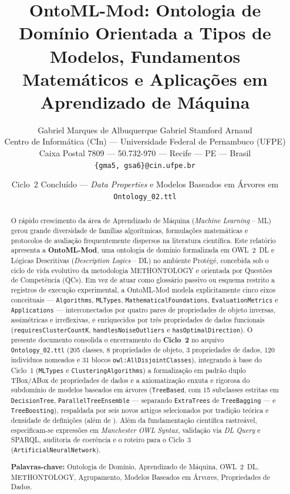 \documentclass[11pt,a4paper]{article}
\title{\textbf{\Large OntoML-Mod: Ontologia de Domínio Orientada a Tipos de Modelos, Fundamentos Matemáticos e Aplicações em Aprendizado de Máquina}}
\author{
  Gabriel Marques de Albuquerque \quad Gabriel Stamford Arnaud \\
  \small Centro de Informática (CIn) --- Universidade Federal de Pernambuco (UFPE) \\
  \small Caixa Postal 7809 --- 50.732-970 --- Recife --- PE --- Brasil \\
  \small \texttt{\{gma5, gsa6\}@cin.ufpe.br}
}
\date{Ciclo~2 Concluído --- \emph{Data Properties} e Modelos Baseados em Árvores em \texttt{Ontology\_02.ttl}}
\newcommand{\onto}[1]{\texttt{#1}}
\begin{document}
\maketitle

\begin{abstract}
\noindent O rápido crescimento da área de Aprendizado de Máquina (\emph{Machine Learning} -- ML) gerou grande diversidade de famílias algorítmicas, formulações matemáticas e protocolos de avaliação frequentemente dispersos na literatura científica. Este relatório apresenta a \textbf{OntoML-Mod}, uma ontologia de domínio formalizada em OWL~2~DL e Lógicas Descritivas (\emph{Description Logics} -- DL) no ambiente Protégé, concebida sob o ciclo de vida evolutivo da metodologia METHONTOLOGY e orientada por Questões de Competência (QCs). Em vez de atuar como glossário passivo ou esquema restrito a registros de execução experimental, a OntoML-Mod modela explicitamente cinco eixos conceituais --- \onto{Algorithms}, \onto{MLTypes}, \onto{MathematicalFoundations}, \onto{EvaluationMetrics} e \onto{Applications} --- interconectados por quatro pares de propriedades de objeto inversas, assimétricas e irreflexivas, e enriquecidos por três propriedades de dados funcionais (\onto{requiresClusterCountK}, \onto{handlesNoiseOutliers} e \onto{hasOptimalDirection}). O presente documento consolida o encerramento do \textbf{Ciclo~2} no arquivo \texttt{Ontology\_02.ttl} (205 classes, 8 propriedades de objeto, 3 propriedades de dados, 120 indivíduos nomeados e 31 blocos \onto{owl:AllDisjointClasses}), integrando à base do Ciclo~1 (\onto{MLTypes} e \onto{ClusteringAlgorithms}) a formalização em padrão duplo TBox/ABox de propriedades de dados e a axiomatização enxuta e rigorosa do subdomínio de modelos baseados em árvores (\onto{TreeBased}, com 15 subclasses estritas em \onto{DecisionTree}, \onto{ParallelTreeEnsemble} --- separando \onto{ExtraTrees} de \onto{TreeBagging} --- e \onto{TreeBoosting}), respaldada por seis novos artigos selecionados por tradição teórica e densidade de definições (além de \cite{sarker2021ml}). Além da fundamentação científica rastreável, especificam-se expressões em \emph{Manchester OWL Syntax}, validação via \emph{DL Query} e SPARQL, auditoria de coerência e o roteiro para o Ciclo~3 (\onto{ArtificialNeuralNetwork}).

\medskip
\noindent\textbf{Palavras-chave:} Ontologia de Domínio, Aprendizado de Máquina, OWL~2~DL, METHONTOLOGY, Agrupamento, Modelos Baseados em Árvores, Propriedades de Dados.
\end{abstract}
\end{document}
